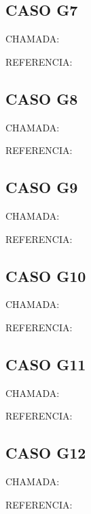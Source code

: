 \documentclass{undftex}
\begin{document}
\begin{refsection}\section*{CASO G7} CHAMADA: \par REFERENCIA:\par\printbibliography[heading=none]\end{refsection}\clearpage
\begin{refsection}\section*{CASO G8} CHAMADA: \par REFERENCIA:\par\printbibliography[heading=none]\end{refsection}\clearpage
\begin{refsection}\section*{CASO G9} CHAMADA: \par REFERENCIA:\par\printbibliography[heading=none]\end{refsection}\clearpage
\begin{refsection}\section*{CASO G10} CHAMADA: \par REFERENCIA:\par\printbibliography[heading=none]\end{refsection}\clearpage
\begin{refsection}\section*{CASO G11} CHAMADA: \par REFERENCIA:\par\printbibliography[heading=none]\end{refsection}\clearpage
\begin{refsection}\section*{CASO G12} CHAMADA: \par REFERENCIA:\par\printbibliography[heading=none]\end{refsection}\clearpage
\end{document}
